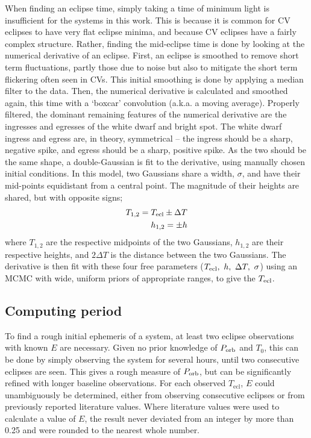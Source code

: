 When finding an eclipse time, simply taking a time of minimum light is insufficient for the systems in this work. This is because it is common for CV eclipses to have very flat eclipse minima, and because CV eclipses have a fairly complex structure.
Rather, finding the mid-eclipse time is done by looking at the numerical derivative of an eclipse.
First, an eclipse is smoothed to remove short term fluctuations, partly those due to noise but also to mitigate the short term flickering often seen in CVs. This initial smoothing is done by applying a median filter to the data. Then, the numerical derivative is calculated and smoothed again, this time with a `boxcar' convolution (a.k.a. a moving average). Properly filtered, the dominant remaining features of the numerical derivative are the ingresses and egresses of the white dwarf and bright spot.
The white dwarf ingress and egress are, in theory, symmetrical -- the ingress should be a sharp, negative spike, and egress should be a sharp, positive spike. As the two should be the same shape, a double-Gaussian is fit to the derivative, using manually chosen initial conditions. In this model, two Gaussians share a width, $\sigma$, and have their mid-points equidistant from a central point. The magnitude of their heights are shared, but with opposite signs;
\begin{align*}
    T_{\rm 1,2} = T_{\rm ecl} \pm \Delta T \\
    h_{\rm 1,2} = \pm h
\end{align*}
where $T_{1,2}$ are the respective midpoints of the two Gaussians, $h_{1,2}$ are their respective heights, and $2\Delta T$ is the distance between the two Gaussians.
The derivative is then fit with these four free parameters ($T_{\rm ecl},\ h,\ \Delta T,\ \sigma$) using an MCMC with wide, uniform priors of appropriate ranges, to give the $T_{\rm ecl}$.

\subsection{Computing period}
\label{sect:modelling:Computing ephemeris}

To find a rough initial ephemeris of a system, at least two eclipse observations with known $E$ are necessary. Given no prior knowledge of $P_{\rm orb}$ and $T_0$, this can be done by simply observing the system for several hours, until two consecutive eclipses are seen. This gives a rough measure of $P_{\rm orb}$, but can be significantly refined with longer baseline observations.
For each observed $T_\mathrm{ecl}$, $E$ could unambiguously be determined, either from observing consecutive eclipses or from previously reported literature values. Where literature values were used to calculate a value of $E$, the result never deviated from an integer by more than 0.25 and were rounded to the nearest whole number.

